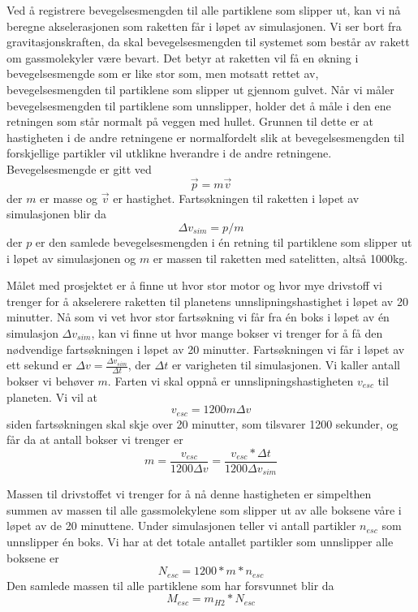 \documentclass[reprint,english,notitlepage]{revtex4-1}  %
\begin{document}
Ved å registrere bevegelsesmengden til alle partiklene som slipper ut, kan vi nå beregne
 akselerasjonen som raketten får i løpet av simulasjonen. Vi ser bort fra gravitasjonskraften, da skal bevegelsesmengden til systemet som består av rakett om gassmolekyler være bevart. Det betyr at raketten vil få en økning i bevegelsesmengde som er like stor som, men motsatt rettet av, bevegelsesmengden til partiklene som slipper ut gjennom gulvet. Når vi måler bevegelsesmengden til partiklene som unnslipper, holder det å måle i den ene retningen som står normalt på veggen med hullet. Grunnen til dette er at hastigheten i de andre retningene er normalfordelt slik at bevegelsesmengden til forskjellige partikler vil utklikne hverandre i de andre retningene. Bevegelsesmengde er gitt ved
 \[
 \vec{p} = m \vec{v}
 \]
 der $m$ er masse og $\vec{v}$ er hastighet. Fartsøkningen til raketten i løpet av simulasjonen blir da
 \[
 \Delta v_{sim} = p/m
 \]
 der $p$ er den samlede bevegelsesmengden i én retning til partiklene som slipper ut i løpet av simulasjonen og $m$ er massen til raketten med satelitten, altså 1000kg.

Målet med prosjektet er å finne ut hvor stor motor og hvor mye drivstoff vi trenger for å
  akselerere raketten til planetens unnslipningshastighet i løpet av 20 minutter. Nå som vi vet hvor stor fartsøkning vi får fra én boks i løpet av én simulasjon $\Delta v_{sim}$, kan vi finne ut hvor mange bokser vi trenger for å få den nødvendige fartsøkningen i løpet av 20 minutter. Fartsøkningen vi får i løpet av ett sekund er $\Delta v = \frac{\Delta v_{sim}}{\Delta t}$, der $\Delta t$ er varigheten til simulasjonen. Vi kaller antall bokser vi behøver $m$. Farten vi skal oppnå er unnslipningshastigheten $v_{esc}$ til planeten. Vi vil at
  \[
  v_{esc} = 1200 m \Delta v
  \]
  siden fartsøkningen skal skje over 20 minutter, som tilsvarer 1200 sekunder, og får da at antall bokser vi trenger er
 \[
 m = \frac{v_{esc}}{1200 \Delta v} = \frac{v_{esc} * \Delta t}{1200 \Delta v_{sim}}
 \]

Massen til drivstoffet vi trenger for å nå denne hastigheten er simpelthen summen av massen
 til alle gassmolekylene som slipper ut av alle boksene våre i løpet av de 20 minuttene. Under simulasjonen teller vi antall partikler $n_{esc}$ som unnslipper én boks. Vi har at det totale antallet partikler som unnslipper alle boksene er
 \[
 N_{esc} = 1200 * m * n_{esc}
 \]
 Den samlede massen til alle partiklene som har forsvunnet blir da
 \[
 M_{esc} = m_{H2} * N_{esc}
 \]
\end{document}
